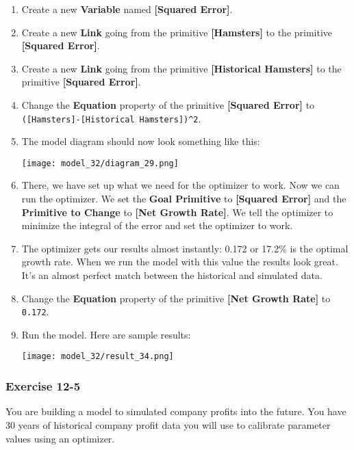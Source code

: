\documentclass[]{memoir}
\makeatletter
\def\maxwidth{\ifdim\Gin@nat@width>\linewidth\linewidth
\else\Gin@nat@width\fi}
\let\Oldincludegraphics\includegraphics
\renewcommand{\includegraphics}[1]{\Oldincludegraphics[width=\maxwidth]{#1}}
\newcommand{\p}[1]{\textbf{{[}#1{]}}}
\newcommand{\e}[1]{\texttt{#1}}
\renewcommand{\a}[1]{\textbf{#1}}
\makeatother
\begin{document}
\begin{oframed}
\begin{enumerate}
\item Create a new \a{Variable} named \p{Squared Error}.
\item Create a new \a{Link} going from the primitive \p{Hamsters} to the primitive \p{Squared Error}.
\item Create a new \a{Link} going from the primitive \p{Historical Hamsters} to the primitive \p{Squared Error}.
\item  Change the \a{Equation} property of the primitive \p{Squared Error} to \e{([Hamsters]-[Historical Hamsters])\^{}2}.
\item The model diagram should now look something like this: \par \begin{minipage}{\linewidth}  \centering \texttt{[image: model\_32/diagram\_29.png]}
\end{minipage}
\item 

There, we have set up what we need for the optimizer to work. Now we can run the optimizer. We set the \textbf{Goal Primitive} to \p{Squared Error} and the \textbf{Primitive to Change} to \p{Net Growth Rate}. We tell the optimizer to minimize the integral of the error and set the optimizer to work.


\item 

The optimizer gets our results almost instantly: 0.172 or 17.2\% is the optimal growth rate. When we run the model with this value the results look great. It's an almost perfect match between the historical and simulated data.


\item  Change the \a{Equation} property of the primitive \p{Net Growth Rate} to \e{0.172}.
\item Run the model. Here are sample results:\par \begin{minipage}{\linewidth}  \centering \texttt{[image: model\_32/result\_34.png]}
\end{minipage}

\end{enumerate} \end{oframed}

\subsubsection{Exercise 12-5}

You are building a model to simulated company profits into the future.
You have 30 years of historical company profit data you will use to
calibrate parameter values using an optimizer.
\end{document}
